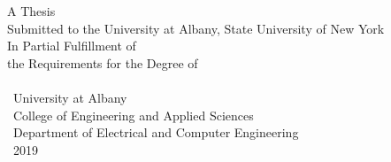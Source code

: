 \documentclass[
12pt, %
english, %
doublespacing, %
liststotoc, %
toctotoc, %
]{MastersDoctoralThesis} %
\begin{document}
\begin{titlepage}
\begin{center}
\vfill
 

{A Thesis\\
Submitted to the University at Albany, State University of New York\\
In Partial Fulfillment of \\
the Requirements for the Degree of\\
\degreename}\\[0.3cm] %
\vfill
\ University at Albany\\%
\ College of Engineering and Applied Sciences\\
\ Department of Electrical and Computer Engineering\\[1cm] %

\large \ 2019\\%
 
\vfill
\end{center}
\end{titlepage}
\let\cleardoublepage\clearpage
\end{document}
